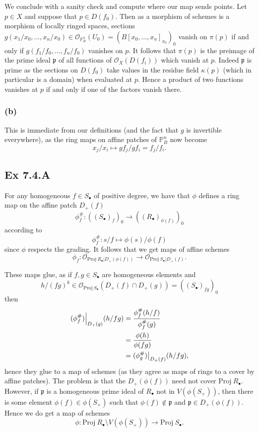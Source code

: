 \documentclass{article}
\newcommand\restr[2]{{%
  \left.\kern-\nulldelimiterspace %
  #1 %
  \vphantom{\big|} %
  \right|_{#2} %
  }}
\theoremstyle{definition}
\renewcommand{\P}{\mathbb{P}}
\newcommand{\Pn}{\P^n}
\newcommand{\Proj}{\text{Proj}}
\begin{document}
We conclude with a sanity check and compute where our map sends points. Let $p
	\in X$ and suppose that $p \in D(f_{0})$. Then as a morphism of schemes is a
morphism of locally ringed spaces, sections $g(x_{1}/x_{0}, \ldots, x_n/x_{0})
	\in \mathcal{O}_{\Pn_{B}}(U_0) = (B[x_{0}, \ldots, x_n]_{x_0})_0$ vanish on
$\pi(p)$ if and only if $g(f_{1}/f_{0}, \ldots, f_n/f_{0})$ vanishes on $p$. It
follows that $\pi(p)$ is the preimage of the prime ideal $\mathfrak{p}$ of all
functions of $\mathcal{O}_X(D(f_i))$ which vanish at $p$. Indeed $\mathfrak{p}$
is prime as the sections on $D(f_0)$ take values in the residue field
$\kappa(p)$ (which in particular is a domain) when evaluated at $p$. Hence a
product of two functions vanishes at $p$ if and only if one of the factors
vanish there.

\subsubsection*{(b)}

This is immediate from our definitions (and the fact that $g$ is invertible
everywhere), as the ring maps on affine patches of $\Pn_{B}$ now become
\[
	x_j/x_i
	\mapsto
	gf_j/gf_i
	=
	f_j/f_i.
\]

\subsection*{Ex 7.4.A}

For any homogeneous $f \in S_{\bullet}$ of positive degree, we have that $\phi$
defines a ring map on the affine patch $D_{+}(f)$
\[
	\phi_f^{\#}
	:
	((S_{\bullet})_f)_0
	\to
	((R_{\bullet})_{\phi(f)})_0
\]
according to
\[
	\phi_f^{\#}
	:
	s/f
	\mapsto
	\phi(s)/\phi(f)
\]
since $\phi$ respects the grading. It follows that we get maps of affine schemes
\[
	\phi_f
	:
	\mathcal{O}_{\Proj\ R_{\bullet} \vert D_{+}(\phi(f))}
	\to
	\mathcal{O}_{\Proj\ S_{\bullet} \vert D_{+}(f)}.
\]

These maps glue, as if $f, g \in S_{\bullet}$ are homogeneous elements and
\[
	h/(fg)^{k}
	\in
	\mathcal{O}_{\Proj\ S_{\bullet}}(D_{+}(f) \cap D_{+}(g))
	=
	((S_{\bullet})_{fg})_{0}
\]
then
\begin{align*}
	\restr{(\phi^{\#}_f)}{D_{+}(g)}(h/fg)
	 & =
	\frac{
		\phi^{\#}_f(h/f)
	}{
		\phi^{\#}_f(g)
	}                        \\
	 & =
	\frac{\phi(h)}{\phi(fg)} \\
	 & =
	\restr{(\phi^{\#}_g)}{D_{+}(f)}(h/fg),
\end{align*}
hence they glue to a map of schemes (as they agree as maps of rings to a cover
by affine patches). The problem is that the $D_{+}(\phi(f))$ need not cover
$\Proj\ R_{\bullet}$. However, if $\mathfrak{p}$ is a homogeneous prime ideal
of $R_{\bullet}$ not in $V(\phi(S_{+}))$, then there is some element $\phi(f)
	\in \phi(S_{+})$ such that $\phi(f) \not \in \mathfrak{p}$ and $\mathfrak{p}
	\in D_{+}(\phi(f))$. Hence we do get a map of schemes
\[
	\phi : \Proj\ R_{\bullet} \setminus V(\phi(S_{+})) \to \Proj\ S_{\bullet}.
\]
\end{document}
